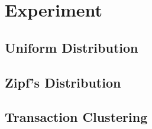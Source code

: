 \section{Experiment}

\subsection{Uniform Distribution}

\subsection{Zipf's Distribution}

\subsection{Transaction Clustering}